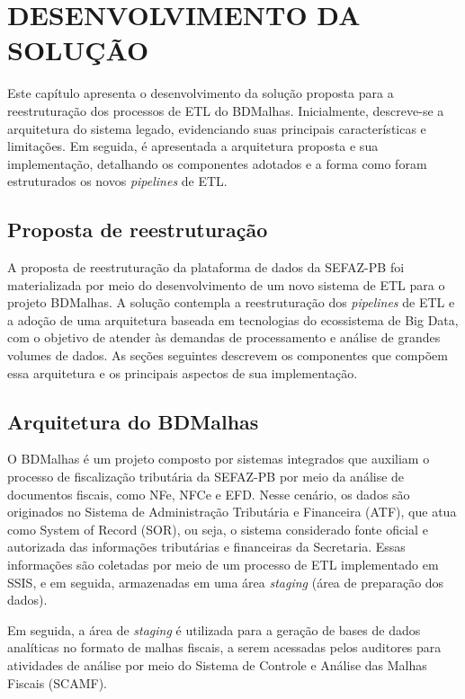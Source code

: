 \chapter{DESENVOLVIMENTO DA SOLUÇÃO}
\label{chap:desenvolvimento}
\thispagestyle{myheadings}

Este capítulo apresenta o desenvolvimento da solução proposta para a reestruturação dos 
processos de ETL do BDMalhas. Inicialmente, descreve-se a arquitetura do sistema legado, 
evidenciando suas principais características e limitações. Em seguida, é apresentada a 
arquitetura proposta e sua implementação, detalhando os componentes adotados e a forma 
como foram estruturados os novos \textit{pipelines} de ETL.

\section{Proposta de reestruturação}

A proposta de reestruturação da plataforma de dados da SEFAZ-PB foi materializada por meio 
do desenvolvimento de um novo sistema de ETL para o projeto BDMalhas. A solução contempla a 
reestruturação dos \textit{pipelines} de ETL e a adoção de uma arquitetura baseada em tecnologias do 
ecossistema de Big Data, com o objetivo de atender às demandas de processamento e análise de 
grandes volumes de dados. As seções seguintes descrevem os componentes que compõem essa 
arquitetura e os principais aspectos de sua implementação.

\section{Arquitetura do BDMalhas}

O BDMalhas é um projeto composto por sistemas integrados que auxiliam o processo de 
fiscalização tributária da SEFAZ-PB por meio da análise de documentos fiscais, como NFe, 
NFCe e EFD. Nesse cenário, os dados são originados no Sistema de Administração Tributária e
Financeira (ATF), que atua como System of Record (SOR), ou seja, o sistema considerado fonte
oficial e autorizada das informações tributárias e financeiras da Secretaria. Essas informações 
são coletadas por meio de um processo de ETL implementado em SSIS, e em seguida, armazenadas 
em uma área \textit{staging} (área de preparação dos dados). 

Em seguida, a área de \textit{staging} é utilizada para a geração de bases de dados analíticas no 
formato de malhas fiscais, a serem acessadas pelos auditores para atividades de análise por meio
do Sistema de Controle e Análise das Malhas Fiscais (SCAMF).

